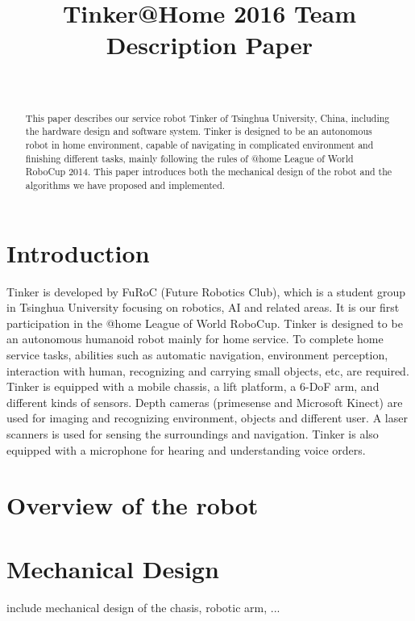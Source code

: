 \documentclass[journal,12pt,onecolumn]{IEEEtran}
\begin{document}
	
\title{Tinker@Home 2016 Team Description Paper}
\author{\\
}
\maketitle


\begin{abstract}
This paper describes our service robot Tinker of Tsinghua University, China, including the hardware design and software system. Tinker is designed to be an autonomous robot in home environment, capable of navigating in complicated environment and finishing different tasks, mainly following the rules of @home League of World RoboCup 2014. This paper introduces both the mechanical design of the robot and the algorithms we have proposed and implemented.
\end{abstract}



\section{Introduction}
Tinker is developed by FuRoC (Future Robotics Club), which is a student group in Tsinghua University focusing on robotics, AI and related areas. It is our first participation in the @home League of World RoboCup. Tinker is designed to be an autonomous humanoid robot mainly for home service. To complete home service tasks, abilities such as automatic navigation, environment perception, interaction with human, recognizing and carrying small objects, etc, are required. Tinker is equipped with a mobile chassis, a lift platform, a 6-DoF arm, and different kinds of sensors. Depth cameras (primesense and Microsoft Kinect) are used for imaging and recognizing environment, objects and different user. A laser scanners is used for sensing the surroundings and navigation. Tinker is also equipped with a microphone for hearing and understanding voice orders.

\section{Overview of the robot}



\section{Mechanical Design}
include mechanical design of the chasis, robotic arm, ...

\end{document}
